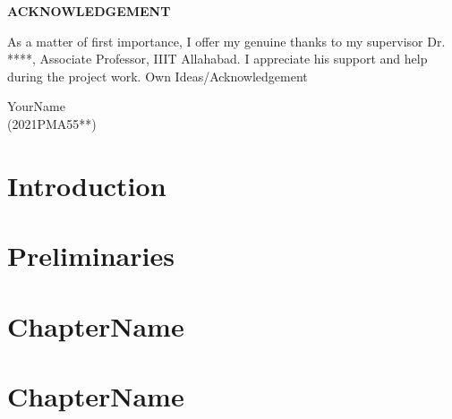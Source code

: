 \documentclass[12pt,a4paper]{article}
\begin{document}
\begin{titlepage}
		
\newpage
    \begin{center}
        {\LARGE \textbf{ACKNOWLEDGEMENT}}\\
    \end{center}
    \vspace{1cm}
    As a matter of first importance, I offer my genuine thanks to my supervisor Dr. ****, Associate Professor, IIIT Allahabad. I appreciate his support and help during the project work. Own Ideas/Acknowledgement\\
    \vspace{1cm}
    
    \begin{flushright}
        {\large YourName}\\(2021PMA55**)\\
    \end{flushright}

\end{titlepage}



\newpage

    \tableofcontents

\newpage


    \section{Introduction}
	\vspace{1cm}
 
\newpage
	
    \section{Preliminaries} 
        \vspace{1cm}

\newpage

    \section{ChapterName}
        \vspace{1cm}

\newpage

    \section{ChapterName}
        \vspace{1cm}
        
\end{document}
